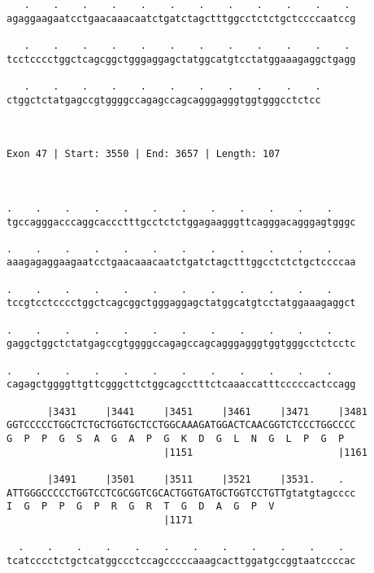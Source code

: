 \documentclass{article}
\begin{document}
\begin{Verbatim}
   .    .    .    .    .    .    .    .    .    .    .    . 
agaggaagaatcctgaacaaacaatctgatctagctttggcctctctgctccccaatccg
                                                            
   .    .    .    .    .    .    .    .    .    .    .    . 
tcctcccctggctcagcggctgggaggagctatggcatgtcctatggaaagaggctgagg
                                                            
   .    .    .    .    .    .    .    .    .    .    .
ctggctctatgagccgtggggccagagccagcagggagggtggtgggcctctcc
                                                      
                                                      
 
Exon 47 | Start: 3550 | End: 3657 | Length: 107



.    .    .    .    .    .    .    .    .    .    .    .    
tgccagggacccaggcaccctttgcctctctggagaagggttcagggacagggagtgggc
                                                            
.    .    .    .    .    .    .    .    .    .    .    .    
aaagagaggaagaatcctgaacaaacaatctgatctagctttggcctctctgctccccaa
                                                            
.    .    .    .    .    .    .    .    .    .    .    .    
tccgtcctcccctggctcagcggctgggaggagctatggcatgtcctatggaaagaggct
                                                            
.    .    .    .    .    .    .    .    .    .    .    .    
gaggctggctctatgagccgtggggccagagccagcagggagggtggtgggcctctcctc
                                                            
.    .    .    .    .    .    .    .    .    .    .    .    
cagagctggggttgttcgggcttctggcagcctttctcaaaccatttcccccactccagg
                                                            
       |3431     |3441     |3451     |3461     |3471     |3481
GGTCCCCCTGGCTCTGCTGGTGCTCCTGGCAAAGATGGACTCAACGGTCTCCCTGGCCCC
G  P  P  G  S  A  G  A  P  G  K  D  G  L  N  G  L  P  G  P  
                           |1151                         |1161
  
       |3491     |3501     |3511     |3521     |3531.    .  
ATTGGGCCCCCTGGTCCTCGCGGTCGCACTGGTGATGCTGGTCCTGTTgtatgtagcccc
I  G  P  P  G  P  R  G  R  T  G  D  A  G  P  V              
                           |1171                            
  
  .    .    .    .    .    .    .    .    .    .    .    .  
tcatcccctctgctcatggccctccagcccccaaagcacttggatgccggtaatccccac
                                                            

\end{Verbatim}
\end{document}
